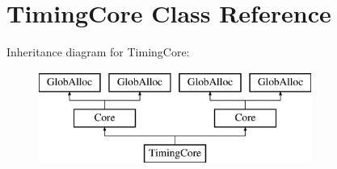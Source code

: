 \hypertarget{classTimingCore}{\section{Timing\-Core Class Reference}
\label{classTimingCore}
}
Inheritance diagram for Timing\-Core\-:\begin{figure}[H]
\begin{center}
\leavevmode
\includegraphics[height=3.000000cm]{classTimingCore}
\end{center}
\end{figure}
